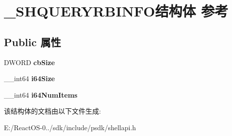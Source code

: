 \hypertarget{struct___s_h_q_u_e_r_y_r_b_i_n_f_o}{}\section{\+\_\+\+S\+H\+Q\+U\+E\+R\+Y\+R\+B\+I\+N\+F\+O结构体 参考}
\label{struct___s_h_q_u_e_r_y_r_b_i_n_f_o}
\subsection*{Public 属性}
\begin{DoxyCompactItemize}
\item 
\mbox{\label{struct___s_h_q_u_e_r_y_r_b_i_n_f_o_ac705e156522a7a4d37d923f6767b601d}} 
D\+W\+O\+RD {\bfseries cb\+Size}
\item 
\mbox{\label{struct___s_h_q_u_e_r_y_r_b_i_n_f_o_a3ade0d266c8663aa7aca298a019829a6}} 
\+\_\+\+\_\+int64 {\bfseries i64\+Size}
\item 
\mbox{\label{struct___s_h_q_u_e_r_y_r_b_i_n_f_o_abc8084b69c039bb8c3554efd2407c636}} 
\+\_\+\+\_\+int64 {\bfseries i64\+Num\+Items}
\end{DoxyCompactItemize}


该结构体的文档由以下文件生成\+:\begin{DoxyCompactItemize}
\item 
E\+:/\+React\+O\+S-\/0../sdk/include/psdk/shellapi.\+h\end{DoxyCompactItemize}
